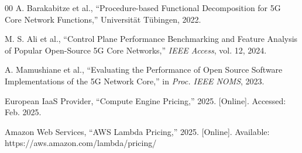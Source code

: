 \begin{thebibliography}{00}
A. Barakabitze et al., ``Procedure-based Functional Decomposition for 5G Core Network Functions,'' Universit\"{a}t T\"{u}bingen, 2022.

M. S. Ali et al., ``Control Plane Performance Benchmarking and Feature Analysis of Popular Open-Source 5G Core Networks,'' \textit{IEEE Access}, vol. 12, 2024.

A. Mamushiane et al., ``Evaluating the Performance of Open Source Software Implementations of the 5G Network Core,'' in \textit{Proc. IEEE NOMS}, 2023.

European IaaS Provider, ``Compute Engine Pricing,'' 2025. [Online]. Accessed: Feb. 2025.

Amazon Web Services, ``AWS Lambda Pricing,'' 2025. [Online]. Available: https://aws.amazon.com/lambda/pricing/

\end{thebibliography}

\balance

